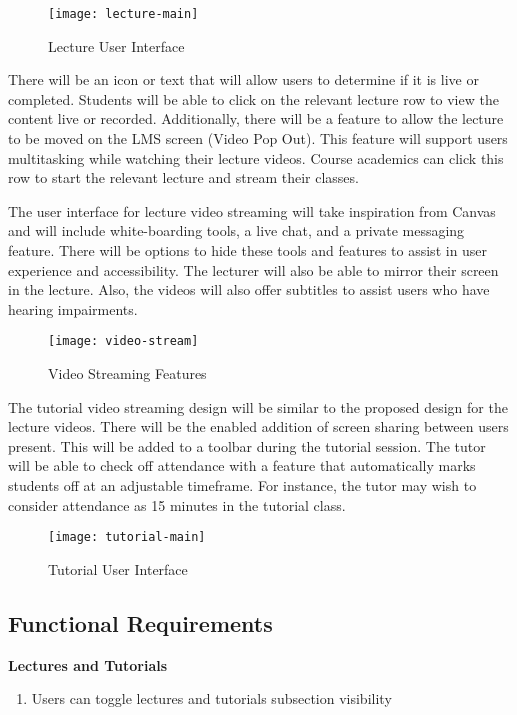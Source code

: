 \begin{figure}[h!]
    \centering
    \texttt{[image: lecture-main]}
    \caption{Lecture User Interface}
\end{figure}

There will be an icon or text that will allow users to determine if it is live or completed. Students will be able to click on the relevant lecture row to view the 
content live or recorded. Additionally, there will be a feature to allow the lecture to be moved on the LMS screen (Video Pop Out). This feature will support users 
multitasking while watching their lecture videos. Course academics can click this row to start the relevant lecture and stream their classes. 

The user interface for lecture video streaming will take inspiration from Canvas and will include white-boarding tools, a live chat, and a private messaging feature. There will be 
options to hide these tools and features to assist in user experience and accessibility. The lecturer will also be able to mirror their screen in the lecture. Also, the 
videos will also offer subtitles to assist users who have hearing impairments. 

\begin{figure}[h!]
  \centering
  \texttt{[image: video-stream]}
  \caption{Video Streaming Features}
\end{figure}

\newpage
The tutorial video streaming design will be similar to the proposed design for the lecture videos. There will be the enabled addition of screen sharing between users present. 
This will be added to a toolbar during the tutorial session. The tutor will be able to check off attendance with a feature that automatically marks students 
off at an adjustable timeframe. For instance, the tutor may wish to consider attendance as 15 minutes in the tutorial class. 

\begin{figure}[h!]
    \centering
    \texttt{[image: tutorial-main]}
    \caption{Tutorial User Interface}
\end{figure}
\newpage


\subsection{Functional Requirements}

\textbf{Lectures and Tutorials}
    \begin{enumerate}
    \item Users can toggle lectures and tutorials subsection visibility
    \end{enumerate}

